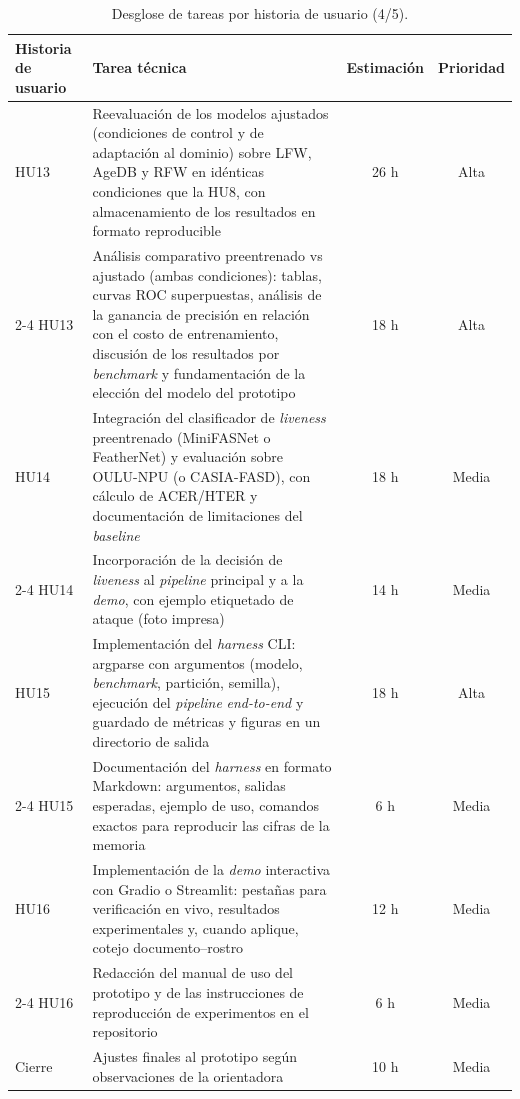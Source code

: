 \documentclass[
  11pt, %
]{charter}
\begin{document}
\begin{table}[htpb]
  \centering
  \small
  \renewcommand{\arraystretch}{0.9}
  \caption{Desglose de tareas por historia de usuario (4/5).}
  \begin{tabularx}{\linewidth}{@{}|X|X|c|c|@{}}
    \hline
    \rowcolor[HTML]{C0C0C0}
    Historia de usuario & Tarea técnica & Estimación & Prioridad \\ \hline

    HU13 & Reevaluación de los modelos ajustados (condiciones de control y de adaptación al dominio) sobre LFW, AgeDB y RFW en idénticas condiciones que la HU8, con almacenamiento de los resultados en formato reproducible & 26 h & Alta \\ \cline{2-4}
    HU13 & Análisis comparativo preentrenado vs ajustado (ambas condiciones): tablas, curvas ROC superpuestas, análisis de la ganancia de precisión en relación con el costo de entrenamiento, discusión de los resultados por \textit{benchmark} y fundamentación de la elección del modelo del prototipo & 18 h & Alta \\ \hline

    HU14 & Integración del clasificador de \textit{liveness} preentrenado (MiniFASNet o FeatherNet) y evaluación sobre OULU-NPU (o CASIA-FASD), con cálculo de ACER/HTER y documentación de limitaciones del \textit{baseline} & 18 h & Media \\ \cline{2-4}
    HU14 & Incorporación de la decisión de \textit{liveness} al \textit{pipeline} principal y a la \textit{demo}, con ejemplo etiquetado de ataque (foto impresa) & 14 h & Media \\ \hline

    HU15 & Implementación del \textit{harness} CLI: argparse con argumentos (modelo, \textit{benchmark}, partición, semilla), ejecución del \textit{pipeline} \textit{end-to-end} y guardado de métricas y figuras en un directorio de salida & 18 h & Alta \\ \cline{2-4}
    HU15 & Documentación del \textit{harness} en formato Markdown: argumentos, salidas esperadas, ejemplo de uso, comandos exactos para reproducir las cifras de la memoria & 6 h & Media \\ \hline

    HU16 & Implementación de la \textit{demo} interactiva con Gradio o Streamlit: pestañas para verificación en vivo, resultados experimentales y, cuando aplique, cotejo documento--rostro & 12 h & Media \\ \cline{2-4}
    HU16 & Redacción del manual de uso del prototipo y de las instrucciones de reproducción de experimentos en el repositorio & 6 h & Media \\ \hline

    Cierre & Ajustes finales al prototipo según observaciones de la orientadora & 10 h & Media \\ \hline

  \end{tabularx}
\end{table}
\end{document}
